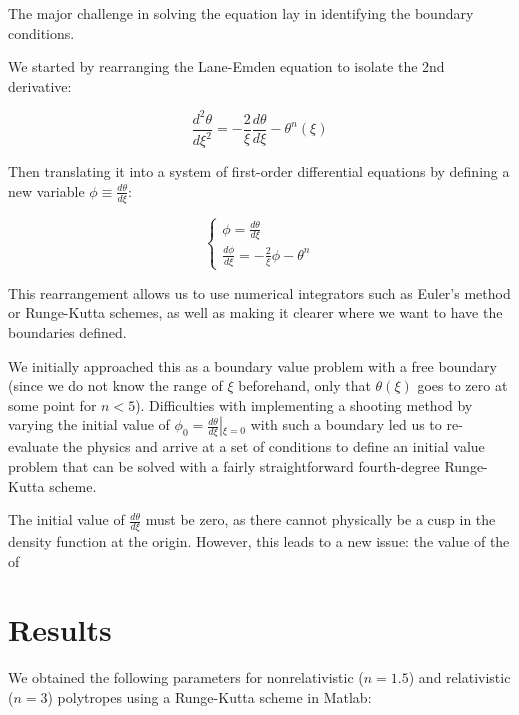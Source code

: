 \documentclass[twoside]{article}
\begin{document}
\begin{multicols}{2}
The major challenge in solving the equation lay in identifying the boundary
conditions. 

We started by rearranging the Lane-Emden equation to isolate the 2nd derivative:

\begin{equation}
    \label{eq:rearrle}
    \frac{d^2\theta}{d\xi^2}=-\frac{2}{\xi}\frac{d\theta}{d\xi}-\theta^n(\xi)
\end{equation}

Then translating it into a system of first-order differential equations by
defining a new variable \(\phi\equiv\frac{d\theta}{d\xi}\):

\begin{equation}
    \label{eq:sysle}
    \left\{\begin{array}{l}
        \phi = \frac{d\theta}{d\xi} \\
        \frac{d\phi}{d\xi} = -\frac{2}{\xi}\phi - \theta^n
    \end{array}\right.
\end{equation}

This rearrangement allows us to use numerical integrators such as Euler's method
or Runge-Kutta schemes, as well as making it clearer where we want to have the
boundaries defined.

We initially approached this as a boundary value problem with a free
boundary\cite[p.756]{nrinc} (since we do not know the range of \(\xi\)
beforehand, only that \(\theta(\xi)\) goes to zero at some point for \(n < 5\)).
Difficulties with implementing a shooting method\cite[pp.474--482]{gsnm} by
varying the initial value of \(\phi_0 =
\frac{d\theta}{d\xi}\left|_{\xi=0}\right.\) with such a boundary led us to
re-evaluate the physics and arrive at a set of conditions to define an initial
value problem that can be solved with a fairly straightforward fourth-degree
Runge-Kutta scheme\cite[pp.411--415]{gsnm}.

The initial value of \(\frac{d\theta}{d\xi}\) must be zero, as there cannot
physically be a cusp in the density function at the origin. However, this leads
to a new issue: the value of the of 



\section{Results}

We obtained the following parameters for nonrelativistic (\(n=1.5\)) and
relativistic (\(n=3\)) polytropes using a Runge-Kutta scheme in Matlab:


\end{multicols}
\end{document}
